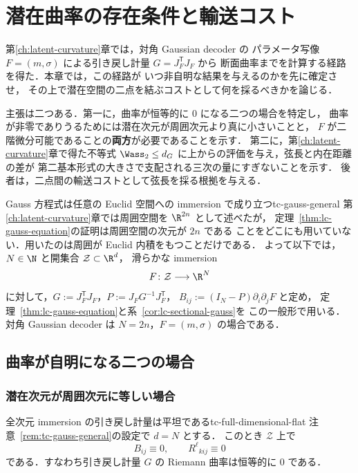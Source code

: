 \chapter{潜在曲率の存在条件と輸送コスト}
\label{ch:transport-cost}

第\ref{ch:latent-curvature}章では，対角 Gaussian decoder の
パラメータ写像 $F=(m,\sigma)$ による引き戻し計量 $G=J_F^{\mathsf T}J_F$ から
断面曲率までを計算する経路を得た．本章では，この経路が
いつ非自明な結果を与えるのかを先に確定させ，
その上で潜在空間の二点を結ぶコストとして何を採るべきかを論じる．

主張は二つある．第一に，曲率が恒等的に $0$ になる二つの場合を特定し，
曲率が非零でありうるためには潜在次元が周囲次元より真に小さいことと，
$F$ が二階微分可能であることの\textbf{両方}が必要であることを示す．
第二に，第\ref{ch:latent-curvature}章で得た不等式
$\Wass_2\leq d_G$ に上からの評価を与え，弦長と内在距離の差が
第二基本形式の大きさで支配される三次の量にすぎないことを示す．
後者は，二点間の輸送コストとして弦長を採る根拠を与える．

\begin{remark}{Gauss 方程式は任意の Euclid 空間への immersion で成り立つ}{tc-gauss-general}
  第\ref{ch:latent-curvature}章では周囲空間を $\R^{2n}$ として述べたが，
  定理~\ref{thm:lc-gauss-equation}の証明は周囲空間の次元が $2n$ である
  ことをどこにも用いていない．用いたのは周囲が Euclid 内積をもつことだけである．
  よって以下では，$N\in\N$ と開集合 $\mathcal{Z}\subset\R^d$，
  滑らかな immersion
  \[
    F\colon\mathcal{Z}\longrightarrow\R^N
  \]
  に対して，$G:=J_F^{\mathsf T}J_F$，$P:=J_FG^{-1}J_F^{\mathsf T}$，
  $B_{ij}:=(I_N-P)\partial_i\partial_jF$ と定め，
  定理~\ref{thm:lc-gauss-equation}と系~\ref{cor:lc-sectional-gauss}を
  この一般形で用いる．対角 Gaussian decoder は $N=2n$，$F=(m,\sigma)$ の場合である．
\end{remark}

\section{曲率が自明になる二つの場合}
\label{sec:tc-degenerate}

\subsection{潜在次元が周囲次元に等しい場合}

\begin{proposition}{全次元 immersion の引き戻し計量は平坦である}{tc-full-dimensional-flat}
  注意~\ref{rem:tc-gauss-general}の設定で $d=N$ とする．
  このとき $\mathcal{Z}$ 上で
  \[
    B_{ij}\equiv0,
    \qquad
    R^\ell{}_{kij}\equiv0
  \]
  である．すなわち引き戻し計量 $G$ の Riemann 曲率は恒等的に $0$ である．
\end{proposition}

